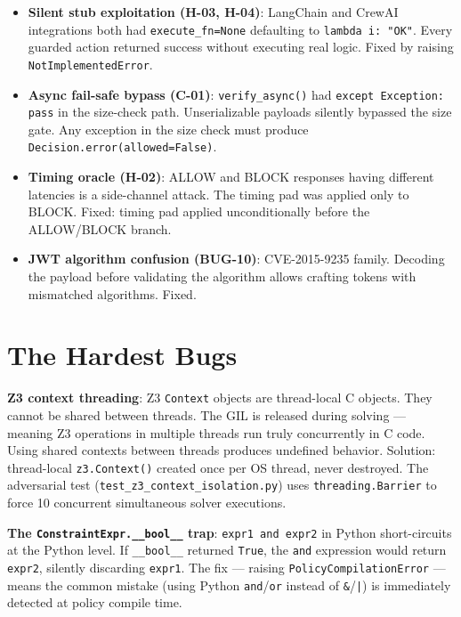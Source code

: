 \documentclass[12pt,a4paper,oneside]{report}
\newcommand{\fname}[1]{\texttt{#1}}          %
\newcommand{\code}[1]{\texttt{#1}}           %
\begin{document}
\begin{itemize}
  \item \textbf{Silent stub exploitation (H-03, H-04)}: LangChain and CrewAI
        integrations both had \code{execute\_fn=None} defaulting to
        \code{lambda i: "OK"}. Every guarded action returned success without
        executing real logic. Fixed by raising \code{NotImplementedError}.

  \item \textbf{Async fail-safe bypass (C-01)}: \code{verify\_async()} had
        \code{except Exception: pass} in the size-check path. Unserializable
        payloads silently bypassed the size gate. Any exception in the size
        check must produce \code{Decision.error(allowed=False)}.

  \item \textbf{Timing oracle (H-02)}: ALLOW and BLOCK responses having
        different latencies is a side-channel attack. The timing pad was applied
        only to BLOCK. Fixed: timing pad applied unconditionally before the
        ALLOW/BLOCK branch.

  \item \textbf{JWT algorithm confusion (BUG-10)}: CVE-2015-9235 family.
        Decoding the payload before validating the algorithm allows crafting
        tokens with mismatched algorithms. Fixed.
\end{itemize}

\section{The Hardest Bugs}

\textbf{Z3 context threading}: Z3 \code{Context} objects are thread-local C
objects. They cannot be shared between threads. The GIL is released during
solving --- meaning Z3 operations in multiple threads run truly concurrently
in C code. Using shared contexts between threads produces undefined behavior.
Solution: thread-local \code{z3.Context()} created once per OS thread, never
destroyed. The adversarial test (\fname{test\_z3\_context\_isolation.py}) uses
\code{threading.Barrier} to force 10 concurrent simultaneous solver executions.

\textbf{The \code{ConstraintExpr.\_\_bool\_\_} trap}: \code{expr1 and expr2}
in Python short-circuits at the Python level. If \code{\_\_bool\_\_} returned
\code{True}, the \code{and} expression would return \code{expr2}, silently
discarding \code{expr1}. The fix --- raising \code{PolicyCompilationError} ---
means the common mistake (using Python \code{and}/\code{or} instead of
\code{\&}/\code{|}) is immediately detected at policy compile time.
\end{document}
